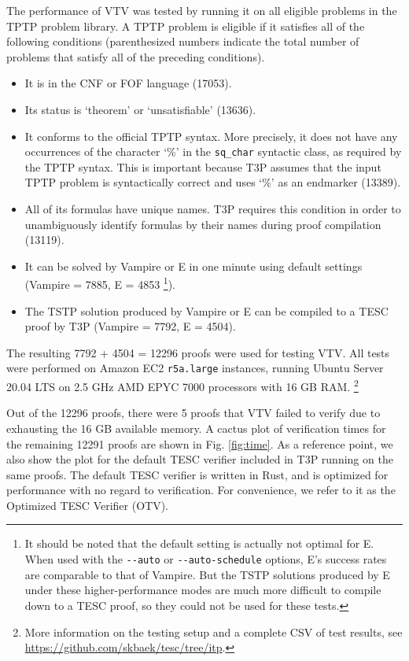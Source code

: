 \documentclass{lipics-v2021}
\begin{document}
The performance of VTV was tested by running it on all eligible problems 
in the TPTP \cite{sutcliffe2009tptp} problem library. A TPTP problem is eligible if it 
satisfies all of the following conditions (parenthesized numbers indicate 
the total number of problems that satisfy all of the preceding conditions).
\begin{itemize}
  \item It is in the CNF or FOF language (17053). 
  \item Its status is `theorem' or `unsatisfiable' (13636).
  \item It conforms to the official TPTP syntax. More precisely, 
    it does not have any occurrences of the character `\%' in the 
    \verb|sq_char| syntactic class, as required by the TPTP syntax.
    This is important because T3P assumes that the input TPTP problem 
    is syntactically correct and uses `\%' as an endmarker (13389).
  \item All of its formulas have unique names. T3P requires this condition 
    in order to unambiguously identify formulas by their names during 
    proof compilation (13119).
  \item It can be solved by Vampire \cite{riazanov2002design} or E \cite{schulz2002brainiac} 
      in one minute using default settings (Vampire = 7885, E = 4853 \footnote{
      It should be noted that the default setting is actually not 
      optimal for E. When used with the \verb|--auto| or \verb|--auto-schedule|
      options, E's success rates are comparable to that of Vampire. 
      But the TSTP solutions produced by E under these higher-performance modes 
      are much more difficult to compile down to a TESC proof, so they 
      could not be used for these tests.
    }).
  \item The TSTP solution produced by Vampire or E can be compiled to 
    a TESC proof by T3P (Vampire = 7792, E = 4504).
\end{itemize}
The resulting 7792 + 4504 = 12296 proofs were used for testing VTV.
All tests were performed on Amazon EC2 \texttt{r5a.large} instances, 
running Ubuntu Server 20.04 LTS on 2.5 GHz AMD EPYC 7000 processors with 
16 GB RAM. 
\footnote{
  More information on the testing setup and a complete CSV of test results,
  see \url{https://github.com/skbaek/tesc/tree/itp}.
}

Out of the 12296 proofs, there were 5 proofs that VTV failed to verify 
due to exhausting the 16 GB available memory. A cactus plot of verification 
times for the remaining 12291 proofs are shown in Fig. \ref{fig:time}. 
As a reference point, we also show the plot for the default TESC verifier 
included in T3P running on the same proofs. The default TESC verifier 
is written in Rust, and is optimized for performance with no regard to 
verification. For convenience, we refer to it as the Optimized TESC Verifier (OTV).
\end{document}
